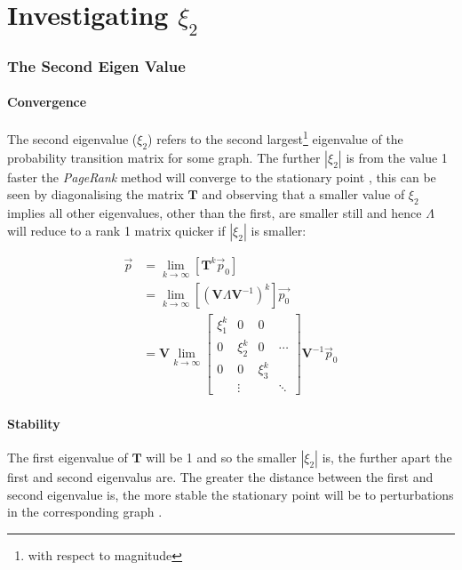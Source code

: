 \documentclass[11pt, twoside]{report}
\begin{document}
\part{Investigating \(\xi_{2}\)}
\section{The Second Eigen Value}
\label{sec:e2-discussion}
\subsection{Convergence}
The second eigenvalue (\(\xi_{2}\)) refers to the second largest\footnote{with respect to magnitude} eigenvalue of the probability transition matrix for some graph. The further \(\left\lvert \xi_{2}\right\rvert\) is from the value 1 faster the \textit{PageRank} method will converge to the stationary point \cite{bryan250000002006}, this can be seen by diagonalising the matrix \(\mathbf{T}\) and observing that a smaller value of \(\xi_{2}\) implies all other eigenvalues, other than the first, are smaller still and hence \(\Lambda\) will reduce to a rank 1 matrix quicker if \(\left\lvert \xi_{2} \right\rvert \) is smaller:

\begin{align}
    \vec{p} &= \lim_{k \rightarrow \infty} \left[ \mathbf{T}^{k} \vec{p}_0 \right]\\
    &= \lim_{k \rightarrow \infty} \left[\left(  \mathbf{V} \Lambda \mathbf{V}^{- 1} \right)^k \right] \vec{p_0} \\
    &= \mathbf{V}
    \lim_{k \rightarrow \infty}
    \begin{bmatrix}
	\xi_1^k &  0       & 0        &                 \\
	0       & \xi_2^k  & 0        & \cdots          \\
	0       & 0        & \xi_3^k  &                 \\
	        & \vdots              &        & \ddots
    \end{bmatrix}
    \mathbf{V}^{- 1} \vec{p}_0
\end{align}


\subsection{Stability}
The first eigenvalue of \(\mathbf{T}\) will be 1 and so the smaller
\(\left\lvert \xi_{2}\right\rvert \) is, the further apart the first and second
eigenvalus are. The greater the distance between the first and second eigenvalue is, the more stable the stationary point will be to perturbations in the corresponding graph
\cite{ngStableAlgorithmsLink2001}.
\end{document}
